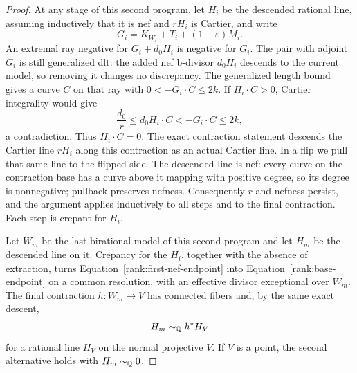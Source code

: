 \begin{proof}
At any stage of this second program, let \(H_i\) be the descended rational
line, assuming inductively that it is nef and \(rH_i\) is Cartier, and write
\[
              G_i=K_{W_i}+T_i+(1-\varepsilon)M_i.
\]
An extremal ray negative for \(G_i+d_0H_i\) is negative for \(G_i\).
The pair with adjoint \(G_i\) is still generalized dlt: the added
nef b-divisor \(d_0H_i\) descends to the current model, so removing
it changes no discrepancy.  The generalized length bound
\cite[Proposition~3.13]{HanLi} gives a curve \(C\)
on that ray with \(0<-G_i\cdot C\leq2k\).  If \(H_i\cdot C>0\),
Cartier integrality would give
\[
               \frac{d_0}{r}\leq d_0H_i\cdot C
                       <-G_i\cdot C\leq2k,
\]
a contradiction.  Thus \(H_i\cdot C=0\).
The exact contraction statement \cite[Theorem~1.5]{Xie2022}
descends the Cartier line \(rH_i\) along this contraction as an
actual Cartier line.  In a flip we pull that same line to the
flipped side.  The descended line is nef: every curve on the
contraction base has a curve above it mapping with positive degree,
so its degree is nonnegative; pullback preserves nefness.
Consequently \(r\) and nefness persist, and the argument applies
inductively to all steps and to the final contraction.  Each step
is crepant for \(H_i\).

Let \(W_m\) be the last birational model of this second program and let
\(H_m\) be the descended line on it.  Crepancy for the \(H_i\), together
with the absence of extraction, turns
Equation~\eqref{rank:first-nef-endpoint} into
Equation~\eqref{rank:base-endpoint} on a common resolution, with an
effective divisor exceptional over \(W_m\).
The final contraction \(h:W_m\to V\) has connected fibers and,
by the same exact descent,
\[
                       H_m\sim_{\mathbb Q}h^*H_V
\]
for a rational line \(H_V\) on the normal projective \(V\).
If \(V\) is a point, the second alternative holds with
\(H_m\sim_{\mathbb Q}0\).


\end{proof}
